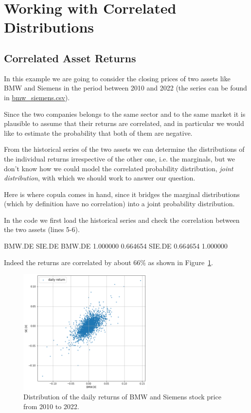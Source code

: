 \section{Working with Correlated Distributions}
\label{sec:generate-correlated-distributions}

\subsection{Correlated Asset Returns}
\label{sec:correlated_stock_returns}

In this example we are going to consider the closing prices of two assets like BMW and Siemens in the period between 2010 and 2022 (the series can be found in \href{https://github.com/matteosan1/finance_course/raw/master/input_files/bmw_siemens.csv}{bmw\_siemens.csv}).

Since the two companies belongs to the same sector and to the same market it is plausible to assume that their returns are correlated, and in particular we would like to estimate the probability that both of them are negative.

From the historical series of the two assets we can determine the distributions of the individual returns irrespective of the other one, i.e. the marginals, but we don't know how we could model the correlated probability distribution, \emph{joint distribution}, with which we should work to answer our question. 

Here is where copula comes in hand, since it bridges the marginal distributions (which by definition have no correlation) into a joint probability distribution. 


In the code we first load the historical series and check the correlation between the two assets (lines 5-6).
\begin{ioutput}
          BMW.DE    SIE.DE
BMW.DE  1.000000  0.664654
SIE.DE  0.664654  1.000000
\end{ioutput}
Indeed the returns are correlated by about 66\% as shown in Figure~\ref{fig:bmw_sie_returns}.

\begin{figure}[htbp]
\centering
\includegraphics[width=0.6\textwidth]{figures/bmw_sie_daily_returns}
\caption{Distribution of the daily returns of BMW and Siemens stock price from 2010 to 2022.}
\label{fig:bmw_sie_returns}
\end{figure}

